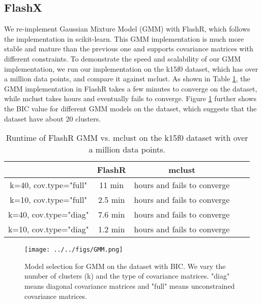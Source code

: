 \documentclass[simplex.tex]{subfiles}
\begin{document}
\subsection{FlashX}

We re-implement Gaussian Mixture Model (GMM) with FlashR, which follows
the implementation in scikit-learn. This GMM implementation is much more
stable and mature than the previous one and supports covariance matrices
with different constraints. To demonstrate the speed and scalability of
our GMM implementation, we run our implementation on the k15f0 dataset,
which has over a million data points, and compare it against mclust.
As shown in Table \ref{tbl:GMM}, the GMM implementation in FlashR takes
a few minutes to converge on the dataset, while mclust takes hours and
eventually fails to converge. Figure \ref{fig:GMM} further shows
the BIC value for different GMM models on the dataset, which suggests
that the dataset have about 20 clusters.

\begin{table}
\begin{center}
\caption{Runtime of FlashR GMM vs. mclust on the k15f0 dataset with over
a million data points.}
\vspace{-10pt}
\footnotesize
\begin{tabular}{|c|c|c|c|c|}
\hline
& FlashR & mclust \\
\hline
k=40, cov.type="full" & 11 min & hours and fails to converge \\
\hline
k=10, cov.type="full" & 2.5 min & hours and fails to converge \\
\hline
k=40, cov.type="diag" & 7.6 min & hours and fails to converge \\
\hline
k=10, cov.type="diag" & 1.2 min & hours and fails to converge \\
\hline
\end{tabular}
\normalsize
\label{tbl:GMM}
\end{center}
\vspace{-10pt}
\end{table}

\begin{figure}[!h]
\begin{cframed}
\centering
\texttt{[image: ../../figs/GMM.png]}
\caption{Model selection for GMM on the dataset with BIC. We vary
the number of clusters (k) and the type of covariance matrices.
"diag" means diagonal covariance matrices and "full" means unconstrained
covariance matrices.}
\label{fig:GMM}
\end{cframed}
\end{figure}
\end{document}
